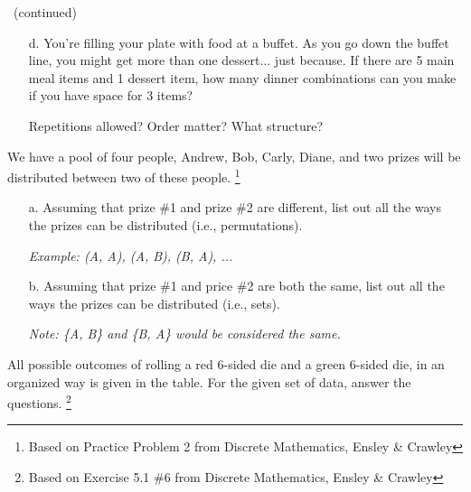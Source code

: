 {\begin{questionNOGRADE}{\thequestion\ (continued)}
\begin{enumerate}
            \item[d.]   You're filling your plate with food at a buffet. As you go down the buffet line,
                        you might get more than one dessert... just because. If there are 5 main meal items
                        and 1 dessert item, how many dinner combinations can you make if you have space for 3 items?
                        \begin{center}
                            Repetitions allowed?
                            \tab Order matter? \tab What structure?
                        \end{center}
        \end{enumerate}
    \end{questionNOGRADE}

    \hrulefill
    
    \begin{questionNOGRADE}{\thequestion}

        We have a pool of four people, Andrew, Bob, Carly, Diane, and two prizes will be distributed
        between two of these people.
        \footnote{Based on Practice Problem 2 from Discrete Mathematics, Ensley \& Crawley}

        \begin{enumerate}
            \item[a.] Assuming that prize \#1 and prize \#2 are different, list out
            all the ways the prizes can be distributed (i.e., permutations).

            \textit{Example: (A, A), (A, B), (B, A), ...}

            \item[b.] Assuming that prize \#1 and price \#2 are both the same,
            list out all the ways the prizes can be distributed (i.e., sets).

            \textit{Note: \{A, B\} and \{B, A\} would be considered the same.}
        \end{enumerate}
        
    \end{questionNOGRADE}

    \newpage

    \begin{questionNOGRADE}{\thequestion}

        All possible outcomes of rolling a red 6-sided die and a green 6-sided die,
        in an organized way is given in the table. For the given set of data, answer the questions.
        \footnote{Based on Exercise 5.1 \#6 from Discrete Mathematics, Ensley \& Crawley}
        ~\\


\end{questionNOGRADE}}
